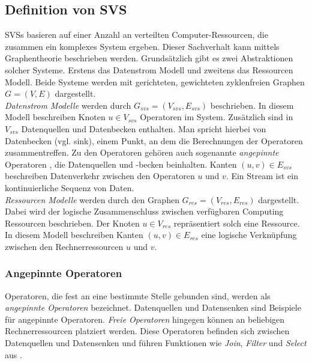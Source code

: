 \documentclass{article}
\begin{document}
\subsection{Definition von SVS}  \label{SVS-Definition}  %
SVSs basieren auf einer Anzahl an verteilten Computer-Ressourcen, die zusammen ein komplexes System ergeben. 
Dieser Sachverhalt kann mittels Graphentheorie beschrieben werden. Grundsätzlich gibt es zwei Abstraktionen solcher Systeme. 
Erstens das Datenstrom Modell und zweitens das Ressourcen Modell. 
Beide Systeme werden mit gerichteten, gewichteten zyklenfreien Graphen $G = (V,E)$ dargestellt. \\


\textit{Datenstrom Modelle} werden durch $G_{svs} = (V_{svs}, E_{svs})$ beschrieben. 
In diesem Modell beschreiben Knoten $u \in V_{svs}$ Operatoren im System. 
Zusätzlich sind in $V_{svs}$ Datenquellen und Datenbecken enthalten. 
Man spricht hierbei von Datenbecken (vgl. sink), einem Punkt, an dem die Berechnungen der Operatoren zusammentreffen. 
Zu den Operatoren gehören auch sogenannte \textit{angepinnte} Operatoren \cite{efficient-operator-placement}, 
die Datenquellen und -becken beinhalten. Kanten $(u,v) \in E_{svs}$ beschreiben Datenverkehr
zwischen den Operatoren $u$ und $v$.  Ein Stream ist ein kontinuierliche Sequenz von Daten. \\


\textit{Ressourcen Modelle} werden durch den Graphen $G_{res} = (V_{res}, E_{res})$ dargestellt. 
Dabei wird der logische Zusammenschluss zwischen verfügbaren Computing Ressourcen beschrieben. Der Knoten $u \in V_{res}$ 
repräsentiert solch eine Ressource. In diesem Modell beschreiben Kanten $(u,v) \in E_{res}$ 
eine logische Verknüpfung zwischen den Rechnerressourcen $u$ und $v$.


\subsubsection{Angepinnte Operatoren}
Operatoren, die fest an eine bestimmte Stelle gebunden sind, werden als \textit{angepinnte Operatoren} bezeichnet. 
Datenquellen und Datensenken sind Beispiele für angepinnte Operatoren. 
\textit{Freie Operatoren} hingegen können an beliebigen Rechnerressourcen platziert werden. Diese Operatoren befinden sich zwischen Datenquellen und Datensenken und führen 
Funktionen wie \textit{Join}, \textit{Filter} und \textit{Select} aus \cite{network-aware-op}.
\end{document}
